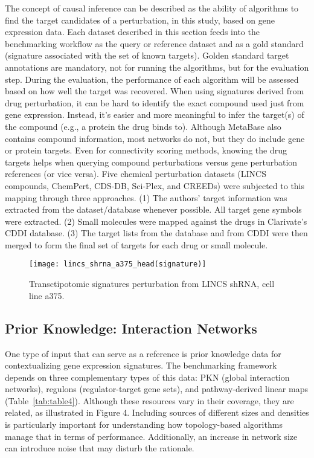
The concept of causal inference can be described as the ability of algorithms to find the target candidates of a perturbation, in this study, based on gene expression data. Each dataset described in this section feeds into the benchmarking workflow as the query or reference dataset and as a gold standard (signature associated with the set of known targets). Golden standard target annotations are mandatory, not for running the algorithms, but for the evaluation step. During the evaluation, the performance of each algorithm will be assessed based on how well the target was recovered. When using signatures derived from drug perturbation, it can be hard to identify the exact compound used just from gene expression. Instead, it's easier and more meaningful to infer the target(s) of the compound (e.g., a protein the drug binds to). Although MetaBase also contains compound information, most networks do not, but they do include gene or protein targets. Even for connectivity scoring methods, knowing the drug targets helps when querying compound perturbations versus gene perturbation references (or vice versa). Five chemical perturbation datasets (LINCS compounds, ChemPert, CDS-DB, Sci-Plex, and CREEDs) were subjected to this mapping through three approaches. (1) The authors' target information was extracted from the dataset/database whenever possible. All target gene symbols were extracted. (2) Small molecules were mapped against the drugs in Clarivate's CDDI database. (3) The target lists from the database and from CDDI were then merged to form the final set of targets for each drug or small molecule.


\begin{figure}[htbp]
    \centering
    \texttt{[image: lincs\_shrna\_a375\_head(signature)]}
    \caption{Transctipotomic signatures perturbation from LINCS shRNA, cell line a375.}
    \label{fig:example_signatures}
\end{figure}



\subsection{Prior Knowledge: Interaction Networks} %
\label{sec:prior_knowledge_interaction_networks}

One type of input that can serve as a reference is prior knowledge data for contextualizing gene expression signatures. 
The benchmarking framework depends on three complementary types of this data: 
PKN (global interaction networks), regulons (regulator-target gene sets), and pathway-derived linear maps (Table~\ref{tab:table4}). 
Although these resources vary in their coverage, they are related, as illustrated in Figure 4. Including sources of different 
sizes and densities is particularly important for understanding how topology-based algorithms manage that in terms of performance. 
Additionally, an increase in network size can introduce noise that may disturb the rationale. 


